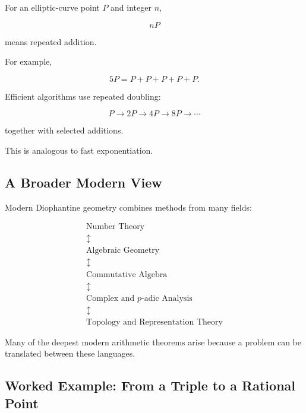 For an elliptic-curve point \(P\) and integer \(n\),

\[ nP \]

means repeated addition.

For example,

\[ 5P=P+P+P+P+P. \]

Efficient algorithms use repeated doubling:

\[
P\longrightarrow2P\longrightarrow4P\longrightarrow8P\longrightarrow\cdots
\]

together with selected additions.

This is analogous to fast exponentiation.

\subsection{A Broader Modern View}
\label{subsec:modern-diophantine-geometry-view}

Modern Diophantine geometry combines methods from many fields:

\[
\begin{array}{c}
\text{Number Theory}\\
\updownarrow\\
\text{Algebraic Geometry}\\
\updownarrow\\
\text{Commutative Algebra}\\
\updownarrow\\
\text{Complex and \(p\)-adic Analysis}\\
\updownarrow\\
\text{Topology and Representation Theory}
\end{array}
\]

Many of the deepest modern arithmetic theorems arise because a problem can
be translated between these languages.

\subsection{Worked Example: From a Triple to a Rational Point}
\label{subsec:worked-triple-rational-point}

